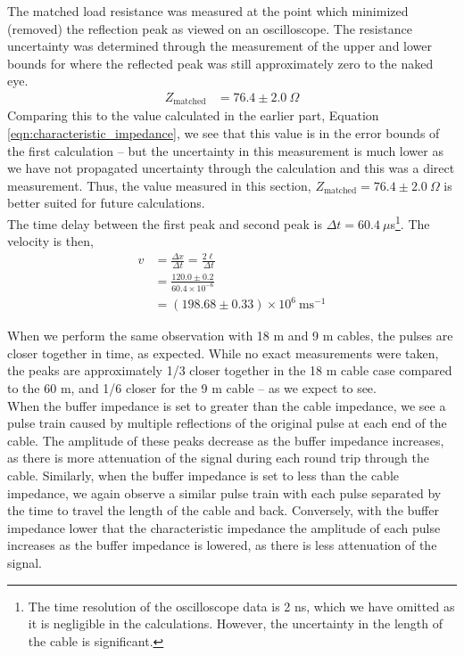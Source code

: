 The matched load resistance was measured at the point which minimized (removed) the reflection peak as viewed on an oscilloscope. The resistance uncertainty was determined through the measurement of the upper and lower bounds for where the reflected peak was still approximately zero to the naked eye.
\begin{align}
    Z_\text{matched} &= 76.4 \pm 2.0 \ \Omega
\end{align}
Comparing this to the value calculated in the earlier part, Equation \ref{eqn:characteristic_impedance}, we see that this value is in the error bounds of the first calculation -- but the uncertainty in this measurement is much lower as we have not propagated uncertainty through the calculation and this was a direct measurement. Thus, the value measured in this section, $Z_\text{matched} = 76.4 \pm 2.0 \ \Omega$ is better suited for future calculations.\\

The time delay between the first peak and second peak is $\Delta t = 60.4 \ \mu$s\footnote{The time resolution of the oscilloscope data is 2 ns, which we have omitted as it is negligible in the calculations. However, the uncertainty in the length of the cable is significant.}. The velocity is then,
\begin{align}
    v &= \frac{\Delta x}{\Delta t} = \frac{2\ell}{\Delta t}\\
    &= \frac{120.0 \pm 0.2}{60.4\times10^{-6}} \\
    &= (198.68 \pm 0.33) \times 10^{6} \ \text{ms$^{-1}$}
\end{align}

When we perform the same observation with 18 m and 9 m cables, the pulses are closer together in time, as expected. While no exact measurements were taken, the peaks are approximately 1/3 closer together in the 18 m cable case compared to the 60 m, and 1/6 closer for the 9 m cable -- as we expect to see. \\

When the buffer impedance is set to greater than the cable impedance, we see a pulse train caused by multiple reflections of the original pulse at each end of the cable. The amplitude of these peaks decrease as the buffer impedance increases, as there is more attenuation of the signal during each round trip through the cable. Similarly, when the buffer impedance is set to less than the cable impedance, we again observe a similar pulse train with each pulse separated by the time to travel the length of the cable and back. Conversely, with the buffer impedance lower that the characteristic impedance the amplitude of each pulse increases as the buffer impedance is lowered, as there is less attenuation of the signal.\\

